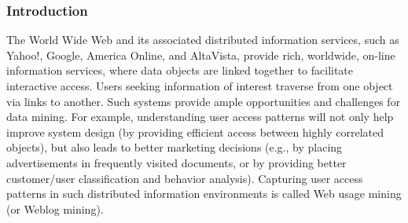 \begin{frame}
    \frametitle{Introduction}
    \begin{minipage}{\textwidth}
        The World Wide Web and its associated distributed information services, such as
        Yahoo!, Google, America Online, and AltaVista, provide rich, worldwide, on-line information
        services, where data objects are linked together to facilitate interactive access.
        Users seeking information of interest traverse from one object via links to another.
        Such systems provide ample opportunities and challenges for data mining. For example,
        understanding user access patterns will not only help improve system design (by
        providing efficient access between highly correlated objects), but also leads to better
        marketing decisions (e.g., by placing advertisements in frequently visited documents,
        or by providing better customer/user classification and behavior analysis). Capturing
        user access patterns in such distributed information environments is called Web usage
        mining (or Weblog mining).
    \end{minipage}
\end{frame}

